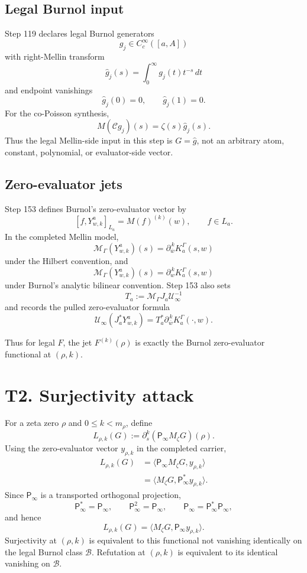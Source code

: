 \documentclass[11pt]{article}
\newcommand{\Psym}{\mathsf P_\infty}
\newcommand{\Mz}{M_\zeta}
\newcommand{\Uinf}{\mathcal U_\infty}
\newcommand{\MG}{\mathcal M_\Gamma}
\newcommand{\Blegal}{\mathcal B}
\begin{document}
\subsection*{Legal Burnol input}

Step 119 declares legal Burnol generators
\[
  g_j\in C_c^\infty([a,A])
\]
with right-Mellin transform
\[
  \widehat g_j(s)=\int_0^\infty g_j(t)t^{-s}\,dt
\]
and endpoint vanishings
\[
  \widehat g_j(0)=0,\qquad \widehat g_j(1)=0.
\]
For the co-Poisson synthesis,
\[
  M(\mathcal Cg_j)(s)=\zeta(s)\widehat g_j(s).
\]
Thus the legal Mellin-side input in this step is \(G=\widehat g\), not an
arbitrary atom, constant, polynomial, or evaluator-side vector.

\subsection*{Zero-evaluator jets}

Step 153 defines Burnol's zero-evaluator vector by
\[
  [f,Y^a_{w,k}]_{L_a}=M(f)^{(k)}(w),
  \qquad f\in L_a.
\]
In the completed Mellin model,
\[
  \MG(Y^a_{w,k})(s)=\partial_{\overline w}^{\,k}K_a^\Gamma(s,w)
\]
under the Hilbert convention, and
\[
  \MG(Y^a_{w,k})(s)=\partial_w^{\,k}K_a^\Gamma(s,w)
\]
under Burnol's analytic bilinear convention. Step 153 also sets
\[
  T_a:=\MG J_a\Uinf^{-1}
\]
and records the pulled zero-evaluator formula
\[
  \Uinf(J_a^*Y^a_{w,k})
  =
  T_a^*\partial_{\overline w}^{\,k}K_a^\Gamma(\cdot,w).
\]

Thus for legal \(F\), the jet \(F^{(k)}(\rho)\) is exactly the Burnol
zero-evaluator functional at \((\rho,k)\).

\section{T2. Surjectivity attack}

For a zeta zero \(\rho\) and \(0\le k<m_\rho\), define
\[
  L_{\rho,k}(G):=\partial_s^k(\Psym\Mz G)(\rho).
\]
Using the zero-evaluator vector \(y_{\rho,k}\) in the completed carrier,
\[
\begin{aligned}
  L_{\rho,k}(G)
    &= \langle \Psym\Mz G,y_{\rho,k}\rangle \\
    &= \langle \Mz G,\Psym^*y_{\rho,k}\rangle.
\end{aligned}
\]
Since \(\Psym\) is a transported orthogonal projection,
\[
  \Psym^*=\Psym,\qquad \Psym^2=\Psym,\qquad \Psym=\Psym^*\Psym,
\]
and hence
\[
  \boxed{
  L_{\rho,k}(G)=\langle \Mz G,\Psym y_{\rho,k}\rangle.
  }
\]
Surjectivity at \((\rho,k)\) is equivalent to this functional not vanishing
identically on the legal Burnol class \(\Blegal\). Refutation at
\((\rho,k)\) is equivalent to its identical vanishing on \(\Blegal\).
\end{document}
